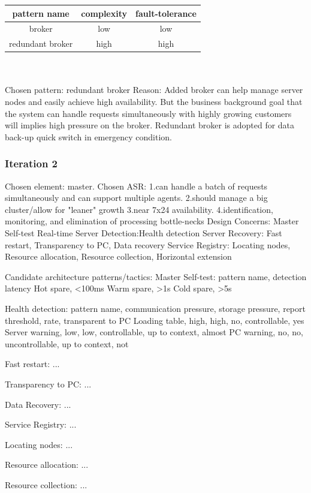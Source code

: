 \documentclass{article}
\begin{document}
		\begin{tabular}{|c|c|c|}
			\hline
			pattern name & complexity& fault-tolerance\\
			\hline
			broker& low& low\\
			\hline
			redundant broker& high& high\\
			\hline
		\end{tabular}
		\\\\
		Chosen pattern: redundant broker
		Reason: Added broker can help manage server nodes and easily achieve high availability. But the business background goal that the system can handle requests simultaneously with highly growing customers will implies high pressure on the broker. Redundant broker is adopted for data back-up quick switch in emergency condition. 

		\subsubsection{Iteration 2}
		Chosen element: master.
		Chosen ASR: 
		1.can handle a batch of requests simultaneously and can support multiple agents.
		2.should manage a big cluster/allow for "leaner" growth
		3.near 7x24 availability.
		4.identification, monitoring, and elimination of processing bottle-necks
		Design Concerns:
		Master Self-test
		Real-time Server Detection:Health detection
		Server Recovery: Fast restart, Transparency to PC, Data recovery
		Service Registry: Locating nodes, Resource allocation, Resource collection, Horizontal extension

		Candidate architecture patterns/tactics:
		Master Self-test:
			pattern name, detection latency
			Hot spare, <100ms
			Warm spare, >1s
			Cold spare, >5s

		Health detection:
			pattern name, communication pressure, storage pressure, report threshold, rate, transparent to PC
			Loading table, high, high, no, controllable, yes 
			Server warning, low, low, controllable, up to context, almost
			PC warning, no, no, uncontrollable, up to context, not
		
		Fast restart:
			...
		
		Transparency to PC:
			...
		
		Data Recovery:
			...
		
		Service Registry:
			...
		
		Locating nodes:
			... 

		Resource allocation:
			...

		Resource collection:
			... 
\end{document}
